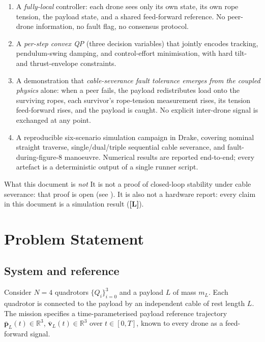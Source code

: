 \documentclass[11pt,a4paper,oneside]{report}
\newcommand{\bp}{\bm{p}}
\newcommand{\bv}{\bm{v}}
\newcommand{\R}{\mathbb{R}}
\newcommand{\Lim}{\textcolor{red!60!black}{\textbf{[L]}}}
\begin{document}
\begin{enumerate}
\item A \emph{fully-local} controller: each drone sees only its own
state, its own rope tension, the payload state, and a shared
feed-forward reference. No peer-drone information, no fault flag,
no consensus protocol.
\item A \emph{per-step convex QP} (three decision variables) that
jointly encodes tracking, pendulum-swing damping, and control-effort
minimisation, with hard tilt- and thrust-envelope constraints.
\item A demonstration that \emph{cable-severance fault tolerance
emerges from the coupled physics} alone: when a peer fails, the
payload redistributes load onto the surviving ropes, each survivor's
rope-tension measurement rises, its tension feed-forward rises,
and the payload is caught. No explicit inter-drone signal is
exchanged at any point.
\item A reproducible six-scenario simulation campaign in Drake,
covering nominal straight traverse, single/dual/triple sequential
cable severance, and fault-during-figure-8 manoeuvre. Numerical
results are reported end-to-end; every artefact is a deterministic
output of a single runner script.
\end{enumerate}

\begin{insight}{What this document is \emph{not}}
It is not a proof of closed-loop stability under cable severance:
that proof is open (see ). It is also not a
hardware report: every claim in this document is a simulation result
(\Lim).
\end{insight}

\chapter{Problem Statement}
\label{chap:problem}

\section{System and reference}

Consider $N=4$ quadrotors $\{Q_i\}_{i=0}^{3}$ and a payload $L$ of mass
$m_L$. Each quadrotor is connected to the payload by an independent
cable of rest length $L$. The mission specifies a time-parameterised
payload reference trajectory $\bar{\bp}_L(t) \in \R^3$,
$\bar{\bv}_L(t) \in \R^3$ over $t\in[0,T]$, known to every drone as a
feed-forward signal.
\end{document}
